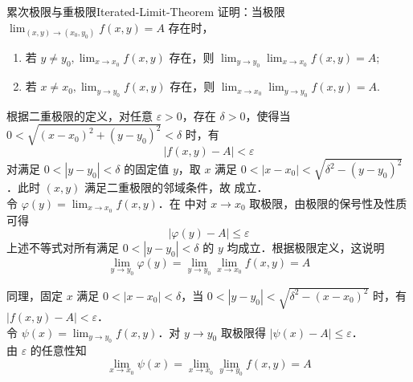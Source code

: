 \begin{problem}{累次极限与重极限}{Iterated-Limit-Theorem}
    证明：当极限 $ \lim_{(x,y) \to (x_0, y_0)} f(x,y) = A$ 存在时，
    \begin{enumerate}
        \item 若 $y \neq y_0,  \lim_{x \to x_0} f(x,y)$ 存在，则 $ \lim_{y \to y_0} \lim_{x \to x_0} f(x,y) = A$;
        \item 若 $x \neq x_0,  \lim_{y \to y_0} f(x,y)$ 存在，则 $ \lim_{x \to x_0} \lim_{y \to y_0} f(x,y) = A$.
    \end{enumerate}
\end{problem}

\begin{myproof}

    根据二重极限的定义，对任意 $\varepsilon > 0$，存在 $\delta > 0$，使得当 $0 < \sqrt{(x-x_0)^2 + (y-y_0)^2} < \delta$ 时，有
    \begin{equation} \label{eq:limit-def-1}
        |f(x,y) - A| < \varepsilon
    \end{equation}
    对满足 $0 < |y - y_0| < \delta$ 的固定值 $y$，取 $x$ 满足 $0 < |x - x_0| < \sqrt{\delta^2 - (y-y_0)^2}$．此时 $(x,y)$ 满足二重极限的邻域条件，故  成立．\\
    令 $\varphi(y) =  \lim_{x \to x_0} f(x,y)$．在  中对 $x \to x_0$ 取极限，由极限的保号性及性质可得
    \begin{equation}
        |\varphi(y) - A| \leqslant \varepsilon
    \end{equation}
    上述不等式对所有满足 $0 < |y - y_0| < \delta$ 的 $y$ 均成立．根据极限定义，这说明
    \begin{equation}
        \lim_{y \to y_0} \varphi(y) = \lim_{y \to y_0} \lim_{x \to x_0} f(x,y) = A
    \end{equation}


    同理，固定 $x$ 满足 $0 < |x - x_0| < \delta$，当 $0 < |y - y_0| < \sqrt{\delta^2 - (x-x_0)^2}$ 时，有 $|f(x,y) - A| < \varepsilon$．\\
    令 $\psi(x) =  \lim_{y \to y_0} f(x,y)$．对 $y \to y_0$ 取极限得 $|\psi(x) - A| \leqslant \varepsilon$．\\
    由 $\varepsilon$ 的任意性知
    \begin{equation}
        \lim_{x \to x_0} \psi(x) = \lim_{x \to x_0} \lim_{y \to y_0} f(x,y) = A
    \end{equation}
\end{myproof}


